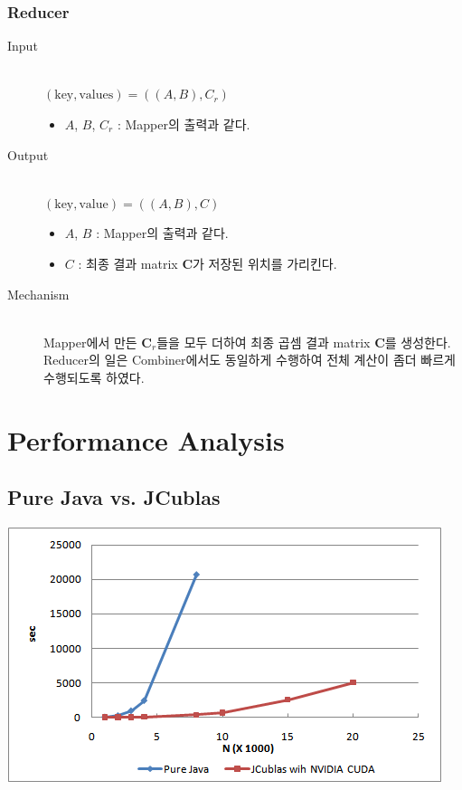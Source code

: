 \documentclass[a4paper]{article}
\begin{document}
\begin{multicols}{2}
\subsubsection{Reducer}
\begin{description}
	\item[Input] \hfill \\
	$(\text{key}, \text{values}) = ((A, B), C_r)$
	\begin{itemize}
		\item $A$, $B$, $C_r$ : Mapper의 출력과 같다.
	\end{itemize}
	\item[Output] \hfill \\
	$(\text{key}, \text{value}) = ((A, B), C)$
	\begin{itemize}
		\item $A$, $B$ : Mapper의 출력과 같다. 
		\item $C$ : 최종 결과 matrix $\mathbf{C}$가 저장된 위치를 가리킨다.
	\end{itemize}
	\item[Mechanism] \hfill \\
	Mapper에서 만든 $\mathbf{C}_r$들을 모두 더하여 최종 곱셈 결과 matrix $\mathbf{C}$를 생성한다.
	Reducer의 일은 Combiner에서도 동일하게 수행하여 전체 계산이 좀더 빠르게 수행되도록 하였다.
\end{description}

\section{Performance Analysis}
\subsection{Pure Java vs. JCublas}
\begin{minipage}{\linewidth}
	\centering
	\includegraphics[width=0.9\linewidth]{chart-java-vs-jcublas.png}
	\label{fig:java-vs-jcublas}
\end{minipage}

\end{multicols}
\end{document}
